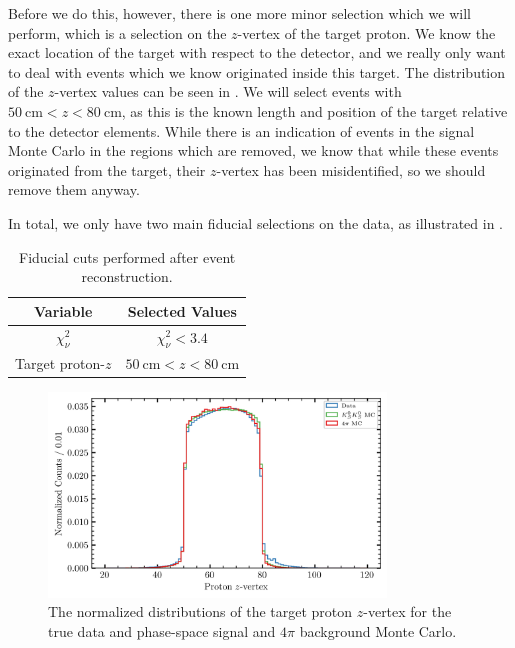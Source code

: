 Before we do this, however, there is one more minor selection which we will perform, which is a selection on the $z$-vertex of the target proton. We know the exact location of the target with respect to the detector, and we really only want to deal with events which we know originated inside this target. The distribution of the $z$-vertex values can be seen in . We will select events with $\SI{50}{\centi\meter} < z < \SI{80}{\centi\meter}$, as this is the known length and position of the target relative to the detector elements. While there is an indication of events in the signal Monte Carlo in the regions which are removed, we know that while these events originated from the target, their $z$-vertex has been misidentified, so we should remove them anyway.

In total, we only have two main fiducial selections on the data, as illustrated in .

\begin{table}
  \begin{center}
    \begin{tabular}{cc}\toprule
      Variable & Selected Values \\\midrule
      $\chi^2_\nu$ & $\chi^2_\nu < 3.4$ \\
      Target proton-$z$ & $\SI{50}{\centi\meter} < z < \SI{80}{\centi\meter}$ \\\bottomrule
    \end{tabular}
    \caption{Fiducial cuts performed after event reconstruction.}\label{tab:fiducial-cuts}
  \end{center}
\end{table}

\begin{figure}
  \begin{center}
    \includegraphics[width=0.8\textwidth]{figures/data_original_combined_protonz.png}
  \end{center}
  \caption{The normalized distributions of the target proton $z$-vertex for the true data and phase-space signal and $4\pi$ background Monte Carlo.}\label{fig:data-original-combined-protonz}
\end{figure}

